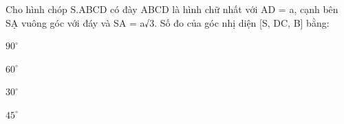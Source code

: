 \begin{question}[type=multiple_choice,difficulty=3,code={I-6}]
Cho hình chóp S.ABCD có đày ABCD là hình chữ nhất với AD = a, cạnh bên SẠ vuông góc với đáy và SA = a√3. Số đo của góc nhị diện [S, DC, B] bằng:

\begin{choice}[label=A]
$ 90^{\circ} $
\end{choice}

\begin{choice}[correct,label=B]
$ 60^{\circ} $
\end{choice}

\begin{choice}[label=C]
$ 30^{\circ} $
\end{choice}

\begin{choice}[label=D]
$ 45^{\circ} $
\end{choice}

\end{question}